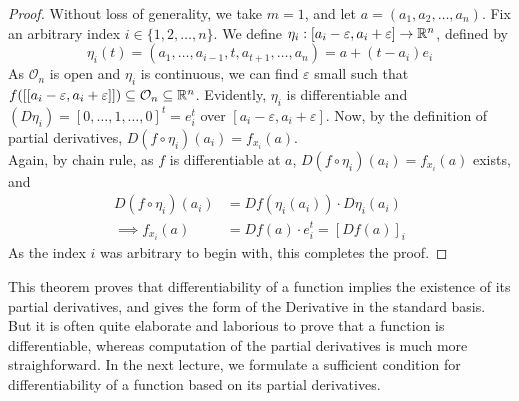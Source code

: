 \documentclass[../Analysis-3.tex]{subfiles}
\begin{document}
\begin{proof}
  Without loss of generality, we take $m = 1$, and let $a = (a_1, a_2, \dots, a_n)$. Fix an arbitrary index $i \in \{1,2,\dots,n \}$. We define $\eta_i : [a_i - \varepsilon,a_i + \varepsilon] \to \mathbb{R}^n$, defined by
  \[\eta_i(t) = (a_1, \dots, a_{i-1}, t, a_{t+1}, \dots, a_n) = a + (t-a_i)e_i \]
  As $\mathcal{O}_n$ is open and $\eta_i$ is continuous, we can find $\varepsilon$ small such that $f([[a_i - \varepsilon,a_i + \varepsilon]]) \subseteq \mathcal{O}_n \subseteq \mathbb{R}^n$. Evidently, $\eta_i$ is differentiable and $(D\eta_i) = [0,\dots,1,\dots,0]^t = e_i^t$ over $[a_i - \varepsilon,a_i + \varepsilon]$. Now, by the definition of partial derivatives, \(D(f\circ\eta_i)(a_i) = f_{x_i} (a)\).\\
  Again, by chain rule, as $f$ is differentiable at $a$, $D(f\circ\eta_i)(a_i) = f_{x_i}(a)$ exists, and
  \begin{align*}
    D(f\circ\eta_i)(a_i) & = Df(\eta_i(a_i)) \cdot D\eta_i (a_i) \\
    \implies f_{x_i} (a) & = Df(a) \cdot e_i^t = [Df(a)]_i
  \end{align*}
  As the index $i$ was arbitrary to begin with, this completes the proof.

\end{proof}

This theorem proves that differentiability of a function implies the existence of its partial derivatives, and gives the form of the Derivative in the standard basis. But it is often quite elaborate and laborious to prove that a function is differentiable, whereas computation of the partial derivatives is much more straighforward. In the next lecture, we formulate a sufficient condition for differentiability of a function based on its partial derivatives.
\end{document}
